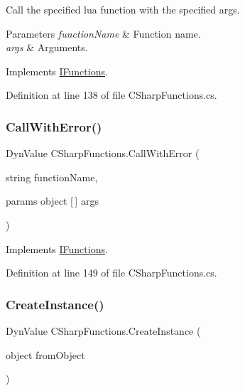 Call the specified lua function with the specified args. 


\begin{DoxyParams}{Parameters}
{\em function\+Name} & Function name.\\
\hline
{\em args} & Arguments.\\
\hline
\end{DoxyParams}


Implements \hyperlink{interface_i_functions_ab14a9a3261c860d7dba22a9c927f1068}{I\+Functions}.



Definition at line 138 of file C\+Sharp\+Functions.\+cs.

\mbox{\label{class_c_sharp_functions_a734f7a4d7c779388343d55e42de203c2}} 
\subsubsection{\texorpdfstring{Call\+With\+Error()}{CallWithError()}}
{\footnotesize\ttfamily Dyn\+Value C\+Sharp\+Functions.\+Call\+With\+Error (\begin{DoxyParamCaption}\item[{string}]{function\+Name,  }\item[{params object \mbox{[}$\,$\mbox{]}}]{args }\end{DoxyParamCaption})}



Implements \hyperlink{interface_i_functions_a6914f7ab45913120802554ac2ef28dba}{I\+Functions}.



Definition at line 149 of file C\+Sharp\+Functions.\+cs.

\mbox{\label{class_c_sharp_functions_ae2a8accaa0f465b627997d145452ec19}} 
\subsubsection{\texorpdfstring{Create\+Instance()}{CreateInstance()}}
{\footnotesize\ttfamily Dyn\+Value C\+Sharp\+Functions.\+Create\+Instance (\begin{DoxyParamCaption}\item[{object}]{from\+Object }\end{DoxyParamCaption})}



